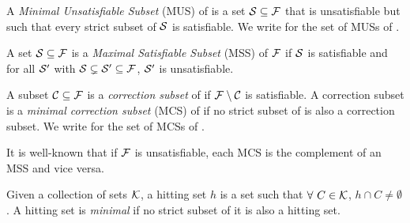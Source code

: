 \begin{definition}
  A \emph{Minimal Unsatisfiable Subset} (MUS) of \F is a set $\mathcal{S} \subseteq \mathcal{F} $  that is unsatisfiable but such that every strict subset of $\mathcal{S} $ is satisfiable. 
%   
  We write \muses{\F} for the set of MUSs of \F. 
\end{definition}



\begin{definition}
    A set $\mathcal{S} \subseteq \mathcal{F} $ is a \emph{Maximal Satisfiable Subset} (MSS) of $ \mathcal{F} $ if $\mathcal{S}$ is satisfiable and for all $\mathcal{S}'$ with $\mathcal{S}  \subsetneq  \mathcal{S}'\subseteq\mathcal{F}  $, $\mathcal{S}'$ is unsatisfiable.
\end{definition}

\begin{definition}
    A subset $\mathcal{C} \subseteq \mathcal{F} $ is a \emph{correction subset} of \formula if $\mathcal{F} \setminus\mathcal{C}$ is satisfiable. 
    A correction subset  is a \emph{minimal correction subset} (MCS)  of \formula if no strict subset of  is also a correction subset. 
    We write \mcses{\F} for the set of MCSs of \F. 
\end{definition}

It is well-known that if $\mathcal{F} $ is unsatisfiable, each  MCS is the complement of an MSS and vice versa. 

\begin{definition}\label{def:minimal-hs}
    Given a collection of sets $\mathcal{K}$, a hitting set $h$ is a set such that $\forall \ C \in \mathcal{K}$, $h \cap C \neq \emptyset$. A hitting set is \emph{minimal} if no strict subset of it is also a hitting set. 
\end{definition}



